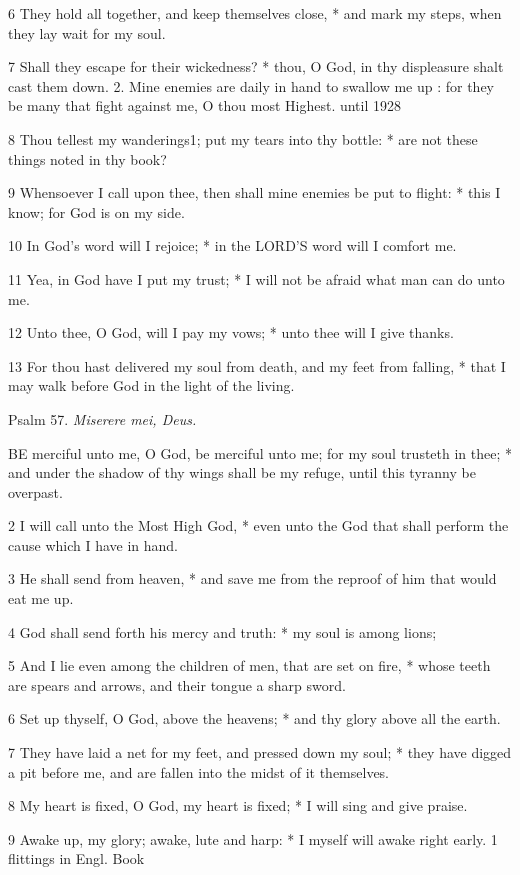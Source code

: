 6 They hold all together, and keep themselves close,
* and mark my steps, when they lay wait for my soul.

7 Shall they escape for their wickedness? * thou, O God,
in thy displeasure shalt cast them down. 2. Mine enemies are daily
in hand to swallow me up : for they be many that fight against me, O thou
most Highest.
until 1928

8 Thou tellest my wanderings1; put my tears into thy
bottle: * are not these things noted in thy book?

9 Whensoever I call upon thee, then shall mine enemies
be put to flight: * this I know; for God is on my side.

10 In God's word will I rejoice; * in the LORD’S
word will I comfort me.

11 Yea, in God have I put my trust; * I will not be
afraid what man can do unto me.

12 Unto thee, O God, will I pay my vows; * unto thee
will I give thanks.

13 For thou hast delivered my soul from death, and
my feet from falling, * that I may walk before God in the light of the
living.

Psalm
57. \emph{Miserere mei, Deus.}

BE
merciful unto me, O God, be merciful unto me; for my soul trusteth in
thee; * and under the shadow of thy wings shall be my refuge, until this
tyranny be overpast.

2 I will call unto the Most High God, * even unto the
God that shall perform the cause which I have in hand.

3 He shall send from heaven, * and save me from the
reproof of him that would eat me up.

4 God shall send forth his mercy and truth: * my soul
is among lions;

5 And I lie even among the children of men, that are
set on fire, * whose teeth are spears and arrows, and their tongue a sharp
sword.

6 Set up thyself, O God, above the heavens; * and thy
glory above all the earth.

7 They have laid a net for my feet, and pressed down
my soul; * they have digged a pit before me, and are fallen into the midst
of it themselves.

8 My heart is fixed, O God, my heart is fixed; * I
will sing and give praise.

9 Awake up, my glory; awake, lute and harp: * I myself
will awake right early. 1 flittings
in Engl. Book


